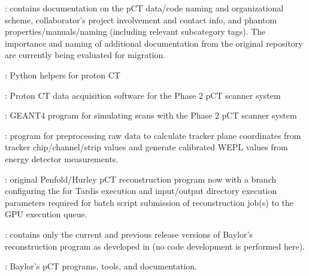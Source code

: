 \begin{tcbenvironment}
\begin{tcbparagraph}
\begin{ThinEnum}[parsep=1mm]
\begin{ThinEnum}[parsep=1mm]
		\item {} : contains documentation on the pCT data/code naming and organizational scheme, collaborator's project involvement and contact info, and phantom properties/manuals/naming (including relevant subcategory tags).  The importance and naming of additional documentation from the original  repository are currently being evaluated for migration.
		\item {} : Python helpers for proton CT
		\item {} : Proton CT data acquisition software for the Phase 2 pCT scanner system
		\item {} : GEANT4 program for simulating scans with the Phase 2 pCT scanner system
		\item {} : program for preprocessing raw data to calculate tracker plane coordinates from tracker chip/channel/strip values and generate calibrated WEPL values from energy detector measurements.
		\item {} : original Penfold/Hurley pCT reconstruction program now with a  branch configuring the  for Tardis execution and input/output directory execution parameters required for batch script submission of reconstruction job(s) to the GPU execution queue.
		\item {} : contains only the current and previous release versions of Baylor's reconstruction program as developed in  (no code development is performed here).
	\end{ThinEnum}
\newpage
	\item {} : Baylor's pCT programs, tools, and documentation.

\end{ThinEnum}
\end{tcbparagraph}
\end{tcbenvironment}
